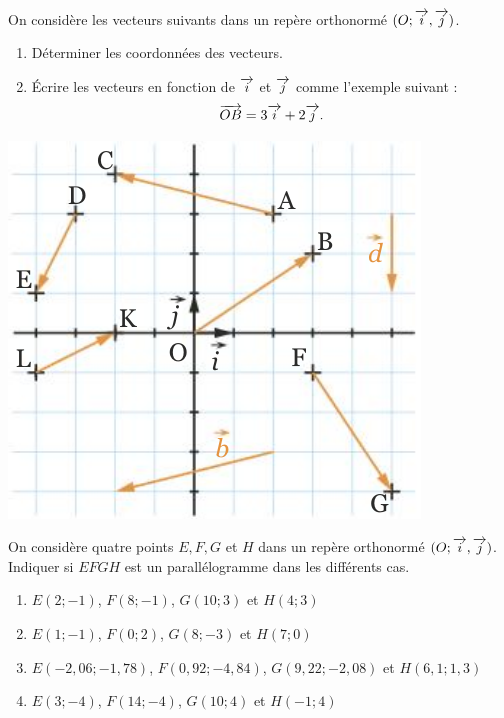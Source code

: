 \documentclass[11pt]{article}
\begin{document}
\begin{exo}~\\[-8mm]
  \begin{minipage}[]{.6\textwidth}
    On considère les vecteurs suivants dans un repère orthonormé $(O; \overrightarrow{i},
    \overrightarrow{j})$.
    \begin{enumerate}
      \item Déterminer les coordonnées des vecteurs.
      \item Écrire les vecteurs en fonction de $\overrightarrow{i}$ et $\overrightarrow{j}$ comme
        l'exemple suivant :
        \[
          \overrightarrow{OB} = 3\overrightarrow{i}+2\overrightarrow{j}.
        \]
    \end{enumerate}
  \end{minipage}
  \begin{minipage}[]{.4\textwidth}
    \begin{center}
      \includegraphics[scale=.4]{quad4.png}
    \end{center}
  \end{minipage}
\end{exo}

\begin{exo}
  On considère quatre points $E, F, G$ et $H$ dans un repère orthonormé $(O;
  \overrightarrow{i}, \overrightarrow{j})$. Indiquer si $EFGH$ est un parallélogramme dans les
  différents cas.
  \begin{enumerate}
    \item $E(2; -1)$, $F(8; -1)$, $G(10; 3)$ et $H(4; 3)$
    \item $E(1; -1)$, $F(0; 2)$, $G(8; -3)$ et $H(7; 0)$
    \item $E(-2,06; -1,78)$, $F(0,92; -4,84)$, $G(9,22; -2,08)$ et $H(6,1; 1,3)$
    \item $E(3; -4)$, $F(14; -4)$, $G(10; 4)$ et $H(-1; 4)$
  \end{enumerate}
\end{exo}
\end{document}
